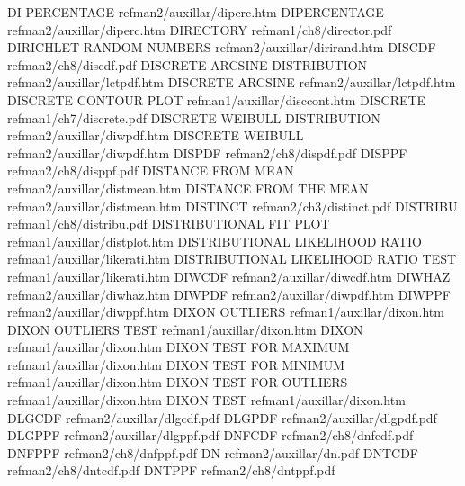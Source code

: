 DI PERCENTAGE                           refman2/auxillar/diperc.htm
DIPERCENTAGE                            refman2/auxillar/diperc.htm
DIRECTORY                               refman1/ch8/director.pdf
DIRICHLET RANDOM NUMBERS                refman2/auxillar/dirirand.htm
DISCDF                                  refman2/ch8/discdf.pdf
DISCRETE ARCSINE DISTRIBUTION           refman2/auxillar/lctpdf.htm
DISCRETE ARCSINE                        refman2/auxillar/lctpdf.htm
DISCRETE CONTOUR PLOT                   refman1/auxillar/disccont.htm
DISCRETE                                refman1/ch7/discrete.pdf
DISCRETE WEIBULL DISTRIBUTION           refman2/auxillar/diwpdf.htm
DISCRETE WEIBULL                        refman2/auxillar/diwpdf.htm
DISPDF                                  refman2/ch8/dispdf.pdf
DISPPF                                  refman2/ch8/disppf.pdf
DISTANCE FROM MEAN                      refman2/auxillar/distmean.htm
DISTANCE FROM THE MEAN                  refman2/auxillar/distmean.htm
DISTINCT                                refman2/ch3/distinct.pdf
DISTRIBU                                refman1/ch8/distribu.pdf
DISTRIBUTIONAL FIT PLOT                 refman1/auxillar/distplot.htm
DISTRIBUTIONAL LIKELIHOOD RATIO         refman1/auxillar/likerati.htm
DISTRIBUTIONAL LIKELIHOOD RATIO TEST    refman1/auxillar/likerati.htm
DIWCDF                                  refman2/auxillar/diwcdf.htm
DIWHAZ                                  refman2/auxillar/diwhaz.htm
DIWPDF                                  refman2/auxillar/diwpdf.htm
DIWPPF                                  refman2/auxillar/diwppf.htm
DIXON OUTLIERS                          refman1/auxillar/dixon.htm
DIXON OUTLIERS TEST                     refman1/auxillar/dixon.htm
DIXON                                   refman1/auxillar/dixon.htm
DIXON TEST FOR MAXIMUM                  refman1/auxillar/dixon.htm
DIXON TEST FOR MINIMUM                  refman1/auxillar/dixon.htm
DIXON TEST FOR OUTLIERS                 refman1/auxillar/dixon.htm
DIXON TEST                              refman1/auxillar/dixon.htm
DLGCDF                                  refman2/auxillar/dlgcdf.pdf
DLGPDF                                  refman2/auxillar/dlgpdf.pdf
DLGPPF                                  refman2/auxillar/dlgppf.pdf
DNFCDF                                  refman2/ch8/dnfcdf.pdf
DNFPPF                                  refman2/ch8/dnfppf.pdf
DN                                      refman2/auxillar/dn.pdf
DNTCDF                                  refman2/ch8/dntcdf.pdf
DNTPPF                                  refman2/ch8/dntppf.pdf
